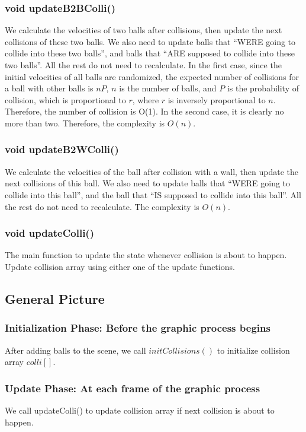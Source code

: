 \documentclass[twoside,11pt]{article}
\begin{document}
\subsubsection{void updateB2BColli()}
We calculate the velocities of two balls after collisions, then update the next collisions of these two balls. We also need to update balls that ``WERE going to collide into these two balls'', and balls that ``ARE supposed to collide into these two balls''. All the rest do not need to recalculate. In the first case, since the initial velocities of all balls are randomized, the expected number of collisions for a ball with other balls is $nP$, $n$ is the number of balls, and $P$ is the probability of collision, which is proportional to $r$, where $r$ is inversely proportional to $n$. Therefore, the number of collision is O(1). In the second case, it is clearly no more than two. Therefore, the complexity is $O(n)$.

\subsubsection{void updateB2WColli()}
We calculate the velocities of the ball after collision with a wall, then update the next collisions of this ball. We also need to update balls that ``WERE going to collide into this ball'', and the ball that ``IS supposed to collide into this ball''. All the rest do not need to recalculate. The complexity is $O(n)$.

\subsubsection{void updateColli()}
The main function to update the state whenever collision is about to happen. Update collision array using either one of the update functions.

\subsection{General Picture}

\subsubsection{Initialization Phase: Before the graphic process begins}
After adding balls to the scene, we call $initCollisions()$ to initialize collision array $colli[]$.


\subsubsection{Update Phase: At each frame of the graphic process}
We call updateColli() to update collision array if next collision is about to happen.
\end{document}
